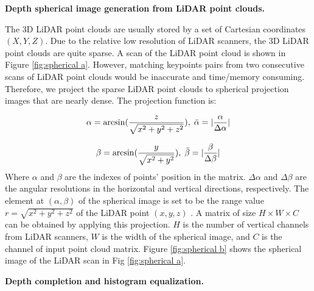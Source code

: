 \documentclass[sigconf]{acmart}
\newcommand{\bfsection}[1]{\vspace*{0.1cm}\noindent\textbf{#1.}}
\begin{document}
\bfsection{Depth spherical image generation from LiDAR point clouds}

The 3D LiDAR point clouds are usually stored by a set of Cartesian coordinates $(X, Y, Z)$. Due to the relative low resolution of LiDAR scanners, the 3D LiDAR point clouds are quite sparse. A scan of the LiDAR point cloud is shown in Figure \ref{fig:spherical a}. However, matching keypoints pairs from two consecutive scans of LiDAR point clouds would be inaccurate and time/memory consuming. Therefore, we project the sparse LiDAR point clouds to spherical projection images that are nearly dense. The projection function is: 

\begin{align}
\small
    \alpha = \arcsin(\frac{z}{\sqrt{x^2 + y^2 +z^2}}), \; 
    \Bar{\alpha} = | \frac{\alpha}{	\Delta\alpha} |
\end{align}

\begin{align}
\small
    \beta = \arcsin(\frac{y}{\sqrt{x^2 + y^2}}), \;
    \Bar{\beta} = | \frac{\beta}{	\Delta\beta} |
\end{align}
Where $\alpha$ and $\beta$ are the indexes of points' position in the matrix. $\Delta\alpha$ and $\Delta\beta$ are the angular resolutions in the horizontal and vertical directions, respectively. The element at $(\alpha, \beta)$ of the spherical image is set to be the range value $r = \sqrt{x^2 + y^2 +z^2} $ of the LiDAR point $(x, y, z)$ \cite{LO-Net}. A matrix of size $H \times W \times C$ can be obtained by applying this projection. $H$ is the number of vertical channels from LiDAR scanners, $W$ is the width of the spherical image, and $C$ is the channel of input point cloud matrix. Figure \ref{fig:spherical b} shows the spherical image of the LiDAR scan in Fig \ref{fig:spherical a}. 


\bfsection{Depth completion and histogram equalization}
\end{document}
